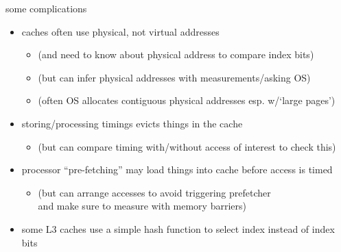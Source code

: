 \begin{frame}{some complications}
    \begin{itemize}
    \item caches often use physical, not virtual addresses
        \begin{itemize}
        \item (and need to know about physical address to compare index bits)
        \item (but can infer physical addresses with measurements/asking OS)
        \item (often OS allocates contiguous physical addresses esp. w/`large pages')
        \end{itemize}
    \item storing/processing timings evicts things in the cache
        \begin{itemize}
        \item (but can compare timing with/without access of interest to check this)
        \end{itemize}
    \item processor ``pre-fetching'' may load things into cache before access is timed
        \begin{itemize}
            \item (but can arrange accesses to avoid triggering prefetcher \\
                and make sure to measure with memory barriers)
        \end{itemize}
    \item some L3 caches use a simple hash function to select index instead of  index bits
    \end{itemize}
\end{frame}

